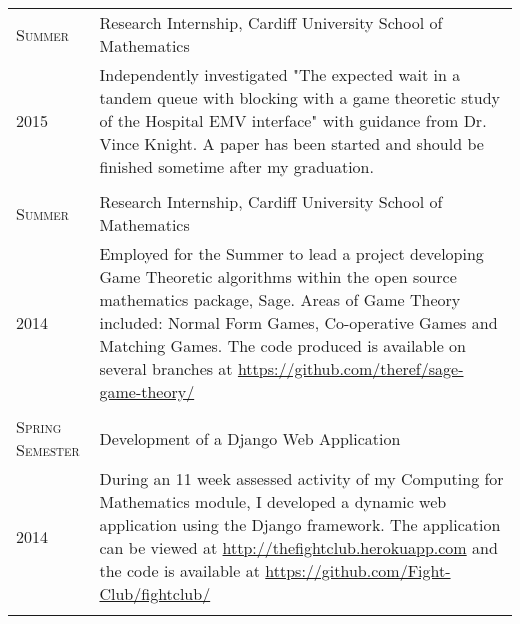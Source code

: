 \documentclass[a4paper]{article}
\begin{document}
\begin{tabularx}{\textwidth}{lX}
\\
\textsc{Summer} & Research Internship, Cardiff University School of Mathematics \\
\textsc{2015} & \footnotesize{Independently investigated "The expected wait in a tandem queue with blocking with a game theoretic study of the Hospital EMV interface" with guidance from Dr. Vince Knight. A paper has been started and should be finished sometime after my graduation.}
\\
\\
\textsc{Summer} & Research Internship, Cardiff University School of Mathematics \\
\textsc{2014} & \footnotesize{Employed for the Summer to lead a project developing Game Theoretic algorithms within the open source mathematics package, Sage.
Areas of Game Theory included: Normal Form Games, Co-operative Games and Matching Games. The code produced is available on several branches at \url{https://github.com/theref/sage-game-theory/}}
\\
\\
\textsc{Spring Semester} & Development of a Django Web Application\\
\textsc{2014} & \footnotesize{During an 11 week assessed activity of my Computing for Mathematics module, I developed a dynamic web application using the Django framework. The application can be viewed at \url{http://thefightclub.herokuapp.com} and the code is available at \url{https://github.com/Fight-Club/fightclub/}}
\\
\\
\end{tabularx}

\end{document}
